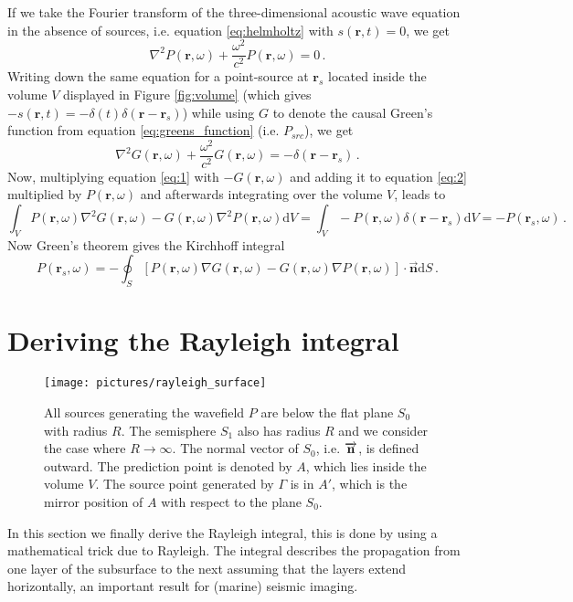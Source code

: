If we take the Fourier transform of the three-dimensional acoustic wave equation in the absence of sources, i.e. equation \ref{eq:helmholtz} with $s(\mathbf r, t)=0$, we get
\begin{equation}
    \nabla^2 P(\mathbf r, \omega) + \frac{\omega^2}{c^2} P(\mathbf r, \omega) = 0 \,. \label{eq:1}
\end{equation}
Writing down the same equation for a point-source at $\mathbf r_s$ located inside the volume $V$ displayed in Figure \ref{fig:volume} (which gives $-s(\mathbf r, t) = -\delta(t)\delta(\mathbf r - \mathbf r_s)$) while using $G$ to denote the causal Green's function from equation \ref{eq:greens_function} (i.e. $P_{src}$), we get
\begin{equation}
    \nabla^2 G(\mathbf r, \omega) + \frac{\omega^2}{c^2} G(\mathbf r, \omega) = -\delta(\mathbf r - \mathbf r_s) \,.\label{eq:2}
\end{equation}
Now, multiplying equation \ref{eq:1} with $-G(\mathbf r, \omega)$ and adding it to equation \ref{eq:2} multiplied by $P(\mathbf r, \omega)$ and afterwards integrating over the volume $V$, leads to
\begin{equation}
    \int_V P(\mathbf r, \omega) \nabla^2 G(\mathbf r, \omega) - G(\mathbf r, \omega) \nabla^2 P(\mathbf r, \omega) \mathrm dV = \int_V -P(\mathbf r, \omega) \delta(\mathbf r - \mathbf r_s) \mathrm d V = -P(\mathbf r_s, \omega) \,.\nonumber
\end{equation}
Now Green's theorem \cite[Section 1.3.4]{electrodynamics} gives the Kirchhoff integral
\begin{equation}
    P(\mathbf r_s, \omega) = - \oint_S [P(\mathbf r, \omega) \nabla G(\mathbf r, \omega) - G(\mathbf r, \omega) \nabla P(\mathbf r, \omega)] \cdot \overrightarrow{\mathbf n} \mathrm dS\,. \label{eq:kirchhoff}
\end{equation}

\section{Deriving the Rayleigh integral}
\label{sec:rayleigh}
\begin{wrapfigure}{r}{.4\textwidth}
    \vspace{-1.2em}
    \texttt{[image: pictures/rayleigh\_surface]}
    \vspace{-2em}
    \caption{All sources generating the wavefield $P$ are below the flat plane $S_0$ with radius $R$. The semisphere $S_1$ also has radius $R$ and we consider the case where $R \to \infty$. The normal vector of $S_0$, i.e. $\protect\overrightarrow{\mathbf{n}}$, is defined outward. The prediction point is denoted by $A$, which lies inside the volume $V$. The source point generated by $\Gamma$ is in $A'$, which is the mirror position of $A$ with respect to the plane $S_0$.}
    \label{fig:semisphere}
    \vspace{-1em}
\end{wrapfigure}
In this section we finally derive the Rayleigh integral, this is done by using a mathematical trick due to Rayleigh.
The integral describes the propagation from one layer of the subsurface to the next assuming that the layers extend horizontally, an important result for (marine) seismic imaging.

